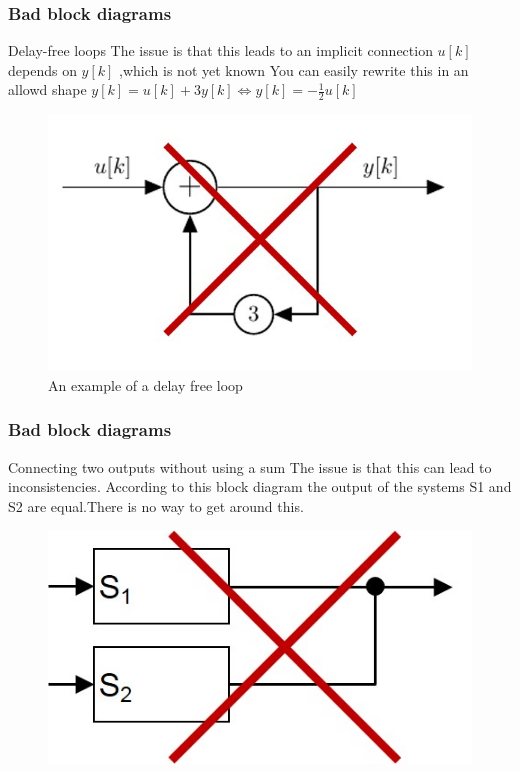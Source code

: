 \begin{frame}
	\frametitle{Bad block diagrams}

				\begin{alertblock}{Delay-free loops}
					The issue is that this leads to an implicit connection 
					$u[k]$ depends on $y[k]$ ,which is not yet known
					You can easily rewrite this in an allowd shape
					$y[k] = u[k]  + 3 y[k] \Longleftrightarrow y[k] = -\frac{1}{2} u[k]$
					\begin{figure}
						\centering
						\includegraphics[width = 0.5\linewidth]{Images/discrete_time_systems_4}
						\caption{An example of a delay free loop}
						\label{fig:discrete_time_systems_4}
					\end{figure}
				\end{alertblock}

		

				

\end{frame}
\begin{frame}
	\frametitle{Bad block diagrams}
		\begin{alertblock}{Connecting two outputs without using a sum}
			The issue is that this can lead to inconsistencies.	According to this block diagram the output of the systems S1 and S2 are equal.There is no way to get around this.
			\begin{figure}
				\centering
				\includegraphics[width = 0.5\linewidth]{Images/discrete_time_systems_5}
				\label{fig:discrete_time_systems_5}
			\end{figure}
		\end{alertblock}
\end{frame}

